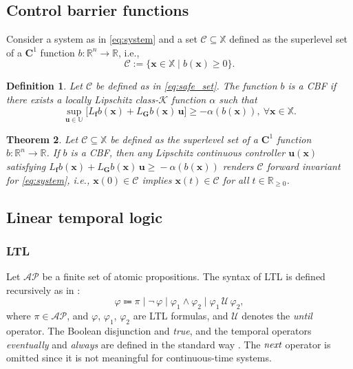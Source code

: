 \documentclass[journal,twoside,web]{ieeecolor}
\newtheorem{theorem}{Theorem}[section]
\newtheorem{definition}[theorem]{Definition}
\begin{document}
\subsection{Control barrier functions}

Consider a system as in \eqref{eq:system} and a set $\mathcal{C} \subseteq \mathbb{X}$ defined as the superlevel set of a $\mathbf{C}^1$ function $b: \mathbb{R}^n \to \mathbb{R}$, i.e., 
\begin{equation} \label{eq:safe_set}
    \mathcal{C} := \{\mathbf{x} \in \mathbb{X} \mid b(\mathbf{x}) \ge 0 \}.
\end{equation}  
\begin{definition}\label{def:cbf}
    Let $\mathcal{C}$ be defined as in \eqref{eq:safe_set}. The function $b$ is a CBF if there exists a locally Lipschitz class-$\mathcal{K}$ function $\alpha$ such that 
    \begin{equation} \label{eq:cbf}
       \sup_{\mathbf{u} \in \mathbb{U}} \Big[ L_\mathbf{f} b ( \mathbf{x}) + L_\mathbf{G} b ( \mathbf{x}) \, \mathbf{u} \Big] \ge -\alpha(b(\mathbf{x})), \ \forall \mathbf{x} \in \mathbb{X}.
    \end{equation}
\end{definition}

\begin{theorem} \label{thm:forward_invariance}
    \cite{ames2019} Let $\mathcal{C} \subseteq \mathbb{X}$ be defined as the superlevel set of a $\mathbf{C}^1$ function $b: \mathbb{R}^n \rightarrow \mathbb{R}$. If $b$ is a CBF, then any Lipschitz continuous controller $\mathbf{u}(\mathbf{x})$ satisfying $L_\mathbf{f} b ( \mathbf{x}) + L_\mathbf{G} b ( \mathbf{x}) \, \mathbf{u} \!\ge\! -\alpha(b(\mathbf{x}))$ renders $\mathcal{C}$ forward invariant for \eqref{eq:system}, i.e., $\mathbf{x}(0) \in \mathcal{C}$ implies $\mathbf{x}(t) \in \mathcal{C} $ for all $t \in \mathbb{R}_{\ge 0}$.
\end{theorem}

\subsection{Linear temporal logic}

\subsubsection{LTL}

Let $\mathcal{AP}$ be a finite set of atomic propositions. The syntax of LTL is defined recursively as in \cite{baier2008}:
\begin{equation*} \label{eq:ltl}
    \varphi \Coloneqq \pi \mid \lnot \, \varphi \mid \varphi_1 \land \varphi_2 \mid \varphi_1 \, \mathcal{U} \, \varphi_2,
\end{equation*}
where $\pi \in \mathcal{AP}$, and $\varphi$, $\varphi_1$, $\varphi_2$ are LTL formulas, and $\mathcal{U}$ denotes the \emph{until} operator. The Boolean disjunction and \emph{true}, and the temporal operators \emph{eventually} and \emph{always} are defined in the standard way \cite{baier2008}. The $\emph{next}$ operator is omitted since it is not meaningful for continuous-time systems.
\end{document}
